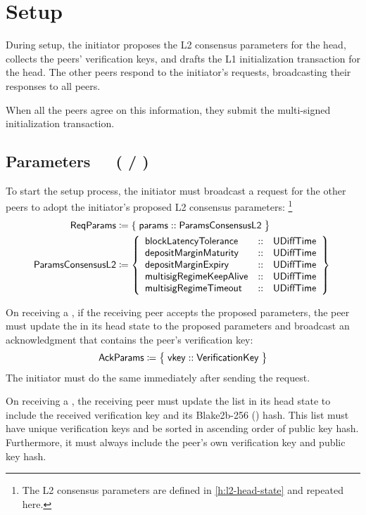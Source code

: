 \documentclass[../hydrozoa.tex]{subfiles}
\begin{document}
\section{Setup}%
\label{h:l2-consensus-setup}%

During setup, the initiator proposes the L2 consensus parameters for the head, collects the peers' verification keys, and drafts the L1 initialization transaction for the head.
The other peers respond to the initiator's requests, broadcasting their responses to all peers.

When all the peers agree on this information, they submit the multi-signed initialization transaction.

\subsection{Parameters~~~( / )}%
\label{h:l2-consensus-parameters}%

To start the setup process, the initiator must broadcast a request for the other peers to adopt the initiator's proposed L2 consensus parameters:%
\footnote{The L2 consensus parameters are defined in \cref{h:l2-head-state} and repeated here.}
\begin{equation*}
\begin{split}
  \T{ReqParams} &\coloneq \{\; \T{params} :: \paramsConsensusTypeName{} \;\bigr\} \\
  \paramsConsensusTypeName{} &\coloneq \paramsConsensusTypeBody{}
\end{split}
\end{equation*}

On receiving a , if the receiving peer accepts the proposed parameters, the peer must update the  in its head state to the proposed parameters and broadcast an acknowledgment that contains the peer's verification key:
\begin{equation*}
  \mathsf{AckParams} \coloneq \;\bigr\{\; \mathsf{vkey} :: \mathsf{VerificationKey} \;\bigr\}
\end{equation*}
The initiator must do the same immediately after sending the  request.

On receiving a , the receiving peer must update the  list in its head state to include the received verification key and its Blake2b-256 () hash.
This list must have unique verification keys and be sorted in ascending order of public key hash.
Furthermore, it must always include the peer's own verification key and public key hash.
\end{document}
